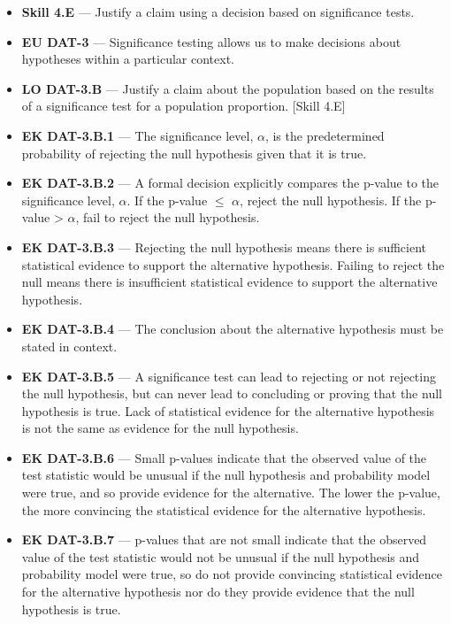 \documentclass[11pt]{article}
\begin{document}


{\small
\begin{itemize}[leftmargin=1.5em,itemsep=2pt,topsep=2pt]
  \item \textbf{Skill 4.E} --- Justify a claim using a decision based on significance tests.
  \item \textbf{EU DAT-3} --- Significance testing allows us to make decisions about hypotheses within a particular context.
  \item \textbf{LO DAT-3.B} --- Justify a claim about the population based on the results of a significance test for a population proportion. [Skill 4.E]
  \item \textbf{EK DAT-3.B.1} --- The significance level, $\alpha$, is the predetermined probability of rejecting the null hypothesis given that it is true.
  \item \textbf{EK DAT-3.B.2} --- A formal decision explicitly compares the p-value to the significance level, $\alpha$. If the p-value $\leq$ $\alpha$, reject the null hypothesis. If the p-value > $\alpha$, fail to reject the null hypothesis.
  \item \textbf{EK DAT-3.B.3} --- Rejecting the null hypothesis means there is sufficient statistical evidence to support the alternative hypothesis. Failing to reject the null means there is insufficient statistical evidence to support the alternative hypothesis.
  \item \textbf{EK DAT-3.B.4} --- The conclusion about the alternative hypothesis must be stated in context.
  \item \textbf{EK DAT-3.B.5} --- A significance test can lead to rejecting or not rejecting the null hypothesis, but can never lead to concluding or proving that the null hypothesis is true. Lack of statistical evidence for the alternative hypothesis is not the same as evidence for the null hypothesis.
  \item \textbf{EK DAT-3.B.6} --- Small p-values indicate that the observed value of the test statistic would be unusual if the null hypothesis and probability model were true, and so provide evidence for the alternative. The lower the p-value, the more convincing the statistical evidence for the alternative hypothesis.
  \item \textbf{EK DAT-3.B.7} --- p-values that are not small indicate that the observed value of the test statistic would not be unusual if the null hypothesis and probability model were true, so do not provide convincing statistical evidence for the alternative hypothesis nor do they provide evidence that the null hypothesis is true.

\end{itemize}}
\end{document}
